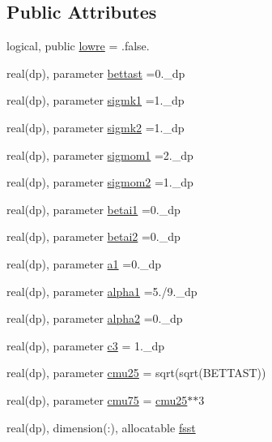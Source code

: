 \subsection*{Public Attributes}
\begin{DoxyCompactItemize}
\item 
logical, public \hyperlink{classk__omega__sst_afd70039b4073095a5203e788db819119}{lowre} = .false.
\item 
real(dp), parameter \hyperlink{classk__omega__sst_aec0edc6222990ba2e0f8be950b183646}{bettast} =0.\-\_\-dp
\item 
real(dp), parameter \hyperlink{classk__omega__sst_a4859960d166f5aae3a709b6914d17858}{sigmk1} =1.\-\_\-dp
\item 
real(dp), parameter \hyperlink{classk__omega__sst_a62372426f37f88c0155f05bb8026909f}{sigmk2} =1.\-\_\-dp
\item 
real(dp), parameter \hyperlink{classk__omega__sst_a0cb7552eb69f1919ecff80bb2e5808e4}{sigmom1} =2.\-\_\-dp
\item 
real(dp), parameter \hyperlink{classk__omega__sst_ad43aa7379d6ca2d18b6b38168e683ac3}{sigmom2} =1.\-\_\-dp
\item 
real(dp), parameter \hyperlink{classk__omega__sst_abccf6e91f0767a91ea49dbe9024e6f2f}{betai1} =0.\-\_\-dp
\item 
real(dp), parameter \hyperlink{classk__omega__sst_ac7304204ed3aa2940a1ece2f12f7e3cb}{betai2} =0.\-\_\-dp
\item 
real(dp), parameter \hyperlink{classk__omega__sst_adbe032a94c6ae8046be321a1d8cbf42a}{a1} =0.\-\_\-dp
\item 
real(dp), parameter \hyperlink{classk__omega__sst_a6ffaa5ad5ebaed915c79cc4a66d3db02}{alpha1} =5./9.\-\_\-dp
\item 
real(dp), parameter \hyperlink{classk__omega__sst_a33436fc9710954a3f0db2ba17777bb85}{alpha2} =0.\-\_\-dp
\item 
real(dp), parameter \hyperlink{classk__omega__sst_a4de6fc64d23bbb9405db42e2bc688365}{c3} = 1.\-\_\-dp
\item 
real(dp), parameter \hyperlink{classk__omega__sst_a2fcd6b5d353eca169d1ed26030035527}{cmu25} = sqrt(sqrt(B\-E\-T\-T\-A\-S\-T))
\item 
real(dp), parameter \hyperlink{classk__omega__sst_aac6d679de77188184e955ebdb8b4f56e}{cmu75} = \hyperlink{classk__omega__sst_a2fcd6b5d353eca169d1ed26030035527}{cmu25}$\ast$$\ast$3
\item 
real(dp), dimension(\-:), allocatable \hyperlink{classk__omega__sst_a6e5e5e6fe57f54e43223912b88f269d7}{fsst}
\end{DoxyCompactItemize}
